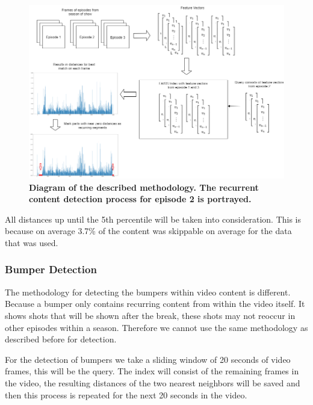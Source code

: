 \documentclass{article}
\begin{document}
\begin{figure}[H]
	\includegraphics[width=\paperwidth, center, scale=0.7]{images/thesisdiagram.png}
	\centering
	\caption{\textbf{Diagram of the described methodology. The recurrent content detection process for episode 2 is portrayed.}}
	\label{fig:diagram}
\end{figure}

All distances up until the 5th percentile will be taken into consideration. This is because on average 3.7\% of the content was skippable on average for the data that was used.

\subsubsection{Bumper Detection}
The methodology for detecting the bumpers within video content is different. Because a bumper only contains recurring content from within the video itself. It shows shots that will be shown after the break, these shots may not reoccur in other episodes within a season. Therefore we cannot use the same methodology as described before for detection.

For the detection of bumpers we take a sliding window of 20 seconds of video frames, this will be the query. The index will consist of the remaining frames in the video, the resulting distances of the two nearest neighbors will be saved and then this process is repeated for the next 20 seconds in the video.
\end{document}
